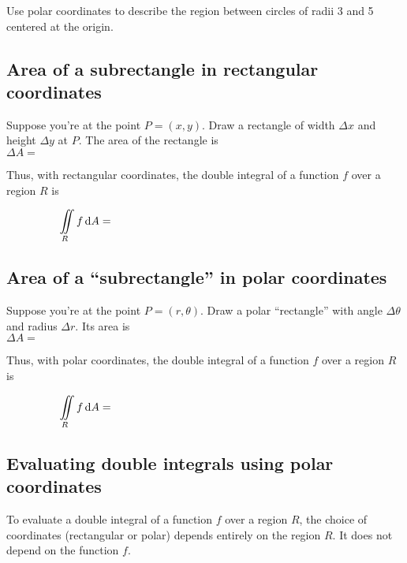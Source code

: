 \vspace{1.5in}

\begin{ex}
    Use polar coordinates to describe the region between circles of radii 3 and 5 centered at the origin.
\end{ex}

\vspace{2in}

\subsection{Area of a subrectangle in rectangular coordinates}
Suppose you're at the point $P=(x,y)$. Draw a rectangle of width $\Delta x$ and height $\Delta y$ at $P$. The area of the rectangle is 
\[
    \Delta A = \hspace{7in} 
\]

\vfill 
Thus, with rectangular coordinates, the double integral of a function $f$ over a region $R$ is \bigskip 

\[
    \iint\limits_R f \dA = \hspace{3in} 
\]

\vspace{1in}

\pagebreak 

\subsection{Area of a ``subrectangle'' in polar coordinates}
Suppose you're at the point $P=(r,\theta)$. Draw a polar ``rectangle'' with angle $\Delta \theta$ and radius $\Delta r$. Its area is \[\Delta A = \hspace{7in}\]
\vspace{2in}

Thus, with polar coordinates, the double integral of a function $f$ over a region $R$ is \bigskip 

\[
    \iint \limits_R f \dA = \hspace{3in} 
\]

\medskip 

\subsection{Evaluating double integrals using polar coordinates}
\begin{framed}
    \noindent 
    To evaluate a double integral of a function $f$ over a region $R$, the choice of coordinates (rectangular or polar) depends entirely on the region $R$. It does not depend on the function $f$.
\end{framed}
\bigskip 

